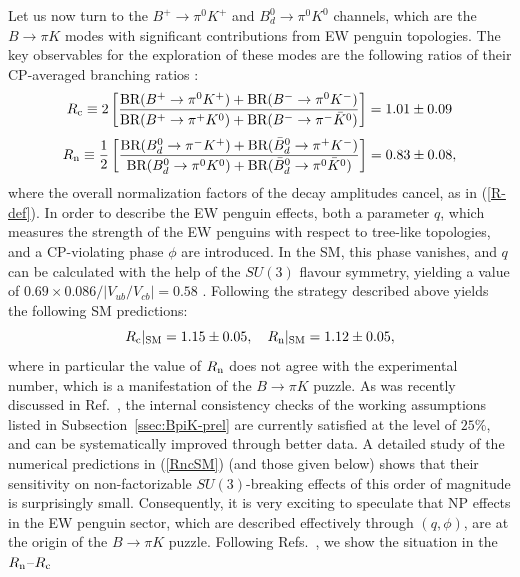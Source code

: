 \documentclass[11pt]{cernrep}
\begin{document}
Let us now turn to the $B^+\to\pi^0K^+$ and $B^0_d\to\pi^0K^0$ channels,
which are the $B\to\pi K$ modes with significant contributions from EW
penguin topologies. The key observables for the exploration of these modes 
are the following ratios of their CP-averaged branching ratios \cite{BF00,BF98}:
\begin{equation}\label{Rc-def}
R_{\rm c}\equiv2\left[\frac{\mbox{BR}(B^+\to\pi^0K^+)+
\mbox{BR}(B^-\to\pi^0K^-)}{\mbox{BR}(B^+\to\pi^+ K^0)+
\mbox{BR}(B^-\to\pi^- \bar K^0)}\right] =%
1.01\pm0.09
\end{equation}
\begin{equation}\label{Rn-def}
R_{\rm n}\equiv\frac{1}{2}\left[
\frac{\mbox{BR}(B_d^0\to\pi^- K^+)+
\mbox{BR}(\bar B_d^0\to\pi^+ K^-)}{\mbox{BR}(B_d^0\to\pi^0K^0)+
\mbox{BR}(\bar B_d^0\to\pi^0\bar K^0)}\right] =%
0.83\pm0.08,
\end{equation}
where the overall normalization factors of the decay amplitudes cancel, 
as in (\ref{R-def}). In order to describe the EW penguin effects, both a parameter 
$q$, which measures the strength of the EW penguins with respect to 
tree-like topologies, and a CP-violating phase $\phi$ are introduced. In the SM, this 
phase vanishes, and $q$ can be calculated with the help of the $SU(3)$ flavour 
symmetry, yielding a value of $0.69 \times 0.086/|V_{ub}/V_{cb}|= 0.58$ \cite{NR}.
Following the strategy described above yields the following SM predictions: 
\begin{equation}\label{RncSM}
R_{\rm c}|_{\rm SM}=1.15 \pm 0.05, \quad R_{\rm n}|_{\rm SM}=1.12 \pm 0.05,
\end{equation}
where in particular the value of $R_{\rm n}$ does not agree with the experimental
number, which is a manifestation of the $B\to\pi K$ puzzle. As was recently
discussed in Ref.~\cite{BFRS-5}, the internal consistency checks of the
working assumptions listed in Subsection~\ref{ssec:BpiK-prel} are
currently satisfied at the level of $25\%$, and can be systematically improved 
through better data. A detailed study of the numerical predictions in 
(\ref{RncSM}) (and those given below) shows that their sensitivity on 
non-factorizable $SU(3)$-breaking effects of this order of magnitude is
surprisingly small. Consequently, it is very exciting to speculate that NP
effects in the EW penguin sector, which are described effectively through
$(q,\phi)$, are at the origin of the $B\to\pi K$ puzzle. 
Following Refs.~\cite{BFRS2,BFRS3}, we show the situation in the 
$R_{\rm n}$--$R_{\rm c}$ 
\end{document}
